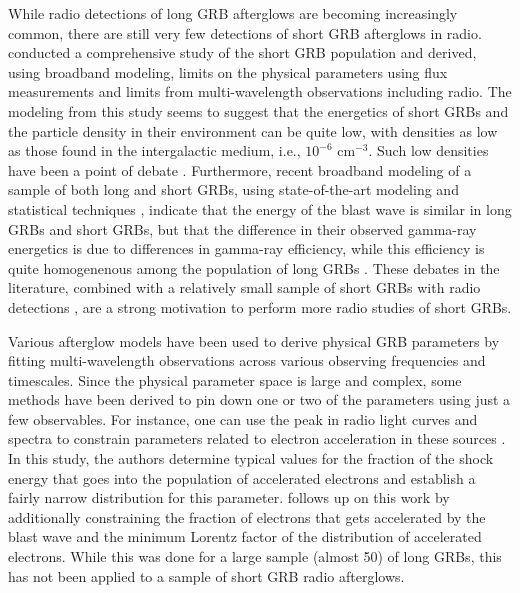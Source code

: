 \documentclass[12pt]{article}
\begin{document}
While radio detections of long GRB afterglows are becoming increasingly common, there are still very few detections of short GRB afterglows in radio. \citet{2015ApJ...815..102F} conducted a comprehensive study of the short GRB population and derived, using broadband modeling, limits on the physical parameters using flux measurements and limits from multi-wavelength observations including radio. The modeling from this study seems to suggest that the energetics of short GRBs and the particle density in their environment can be quite low, with densities as low as those found in the intergalactic medium, i.e., $10^{-6}$ cm$^{-3}$. Such low densities have been a point of debate \citep{2020MNRAS.495.4782O}. Furthermore, recent broadband modeling of a sample of both long and short GRBs, using state-of-the-art modeling and statistical techniques \citep{2022MNRAS.511.2848A}, indicate that the energy of the blast wave is similar in long GRBs and short GRBs, but that the difference in their observed gamma-ray energetics is due to differences in gamma-ray efficiency, while this efficiency is quite homogenenous among the population of long GRBs \citep{2016MNRAS.461...51B}. These debates in the literature, combined with a relatively small sample of short GRBs with radio detections \citep{2021ApJ...906..127F}, are a strong motivation to perform more radio studies of short GRBs.

Various afterglow models \citep[e.g.,][]{2002ApJ...568..820G,2012ApJ...749...44V} have been used to derive physical GRB parameters by fitting multi-wavelength observations across various observing frequencies and timescales. Since the physical parameter space is large and complex, some methods have been derived to pin down one or two of the parameters using just a few observables. For instance, one can use the peak in radio light curves and spectra to constrain parameters related to electron acceleration in these sources \citep{2017MNRAS.472.3161B}. In this study, the authors determine typical values for the fraction of the shock energy that goes into the population of accelerated electrons and establish a fairly narrow distribution for this parameter. \citet{2023MNRAS.518.1522D} follows up on this work by additionally constraining the fraction of electrons that gets accelerated by the blast wave and the minimum Lorentz factor of the distribution of accelerated electrons. While this was done for a large sample (almost 50) of long GRBs, this has not been applied to a sample of short GRB radio afterglows.
\end{document}
